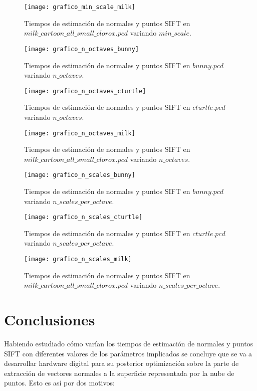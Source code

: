 \begin{figure}[h!]
\centering
\texttt{[image: grafico\_min\_scale\_milk]}
\caption{Tiempos de estimación de normales y puntos SIFT en $milk\_cartoon\_all\_small\_clorox.pcd$ variando $min\_scale$.}\label{fig:grafico_min_scale_milk}
\end{figure}


\begin{figure}[h!]
\centering
\texttt{[image: grafico\_n\_octaves\_bunny]}
\caption{Tiempos de estimación de normales y puntos SIFT en $bunny.pcd$ variando $n\_octaves$.}\label{fig:grafico_n_octaves_bunny}
\end{figure}

\begin{figure}[h!]
\centering
\texttt{[image: grafico\_n\_octaves\_cturtle]}
\caption{Tiempos de estimación de normales y puntos SIFT en $cturtle.pcd$ variando $n\_octaves$.}\label{fig:grafico_n_octaves_cturtle}
\end{figure}

\begin{figure}[h!]
\centering
\texttt{[image: grafico\_n\_octaves\_milk]}
\caption{Tiempos de estimación de normales y puntos SIFT en $milk\_cartoon\_all\_small\_clorox.pcd$ variando $n\_octaves$.}\label{fig:grafico_n_octaves_milk}
\end{figure}


\begin{figure}[h!]
\centering
\texttt{[image: grafico\_n\_scales\_bunny]}
\caption{Tiempos de estimación de normales y puntos SIFT en $bunny.pcd$ variando $n\_scales\_per\_octave$.}\label{fig:grafico_n_scales_bunny}
\end{figure}

\begin{figure}[h!]
\centering
\texttt{[image: grafico\_n\_scales\_cturtle]}
\caption{Tiempos de estimación de normales y puntos SIFT en $cturtle.pcd$ variando $n\_scales\_per\_octave$.}\label{fig:grafico_n_scales_cturtle}
\end{figure}


\begin{figure}[h!]
\centering
\texttt{[image: grafico\_n\_scales\_milk]}
\caption{Tiempos de estimación de normales y puntos SIFT en $milk\_cartoon\_all\_small\_clorox.pcd$ variando $n\_scales\_per\_octave$.}\label{fig:grafico_n_scales_milk}
\end{figure}



\section{Conclusiones}
Habiendo estudiado cómo varían los tiempos de estimación de normales y puntos SIFT con diferentes valores de los parámetros implicados se concluye que se va a desarrollar hardware digital para su posterior optimización sobre la parte de extracción de vectores normales a la superficie representada por la nube de puntos. Esto es así por dos motivos:

